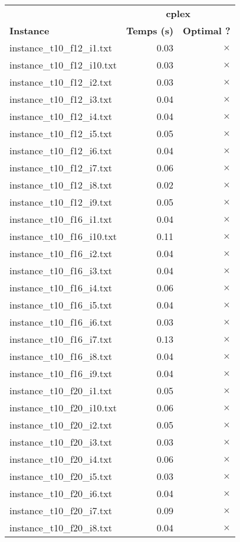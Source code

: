 \documentclass{article}
\begin{document}
\begin{center}
\renewcommand{\arraystretch}{1.4} 
\begin{tabular}{lrr}
	\hline
 & \multicolumn{2}{c}{\textbf{cplex}}\\
\textbf{Instance}  & \textbf{Temps (s)} & \textbf{Optimal ?} \\\hline

instance\_t10\_f12\_i1.txt & 0.03 & 
$\times$
\\
instance\_t10\_f12\_i10.txt & 0.03 & 
$\times$
\\
instance\_t10\_f12\_i2.txt & 0.03 & 
$\times$
\\
instance\_t10\_f12\_i3.txt & 0.04 & 
$\times$
\\
instance\_t10\_f12\_i4.txt & 0.04 & 
$\times$
\\
instance\_t10\_f12\_i5.txt & 0.05 & 
$\times$
\\
instance\_t10\_f12\_i6.txt & 0.04 & 
$\times$
\\
instance\_t10\_f12\_i7.txt & 0.06 & 
$\times$
\\
instance\_t10\_f12\_i8.txt & 0.02 & 
$\times$
\\
instance\_t10\_f12\_i9.txt & 0.05 & 
$\times$
\\
instance\_t10\_f16\_i1.txt & 0.04 & 
$\times$
\\
instance\_t10\_f16\_i10.txt & 0.11 & 
$\times$
\\
instance\_t10\_f16\_i2.txt & 0.04 & 
$\times$
\\
instance\_t10\_f16\_i3.txt & 0.04 & 
$\times$
\\
instance\_t10\_f16\_i4.txt & 0.06 & 
$\times$
\\
instance\_t10\_f16\_i5.txt & 0.04 & 
$\times$
\\
instance\_t10\_f16\_i6.txt & 0.03 & 
$\times$
\\
instance\_t10\_f16\_i7.txt & 0.13 & 
$\times$
\\
instance\_t10\_f16\_i8.txt & 0.04 & 
$\times$
\\
instance\_t10\_f16\_i9.txt & 0.04 & 
$\times$
\\
instance\_t10\_f20\_i1.txt & 0.05 & 
$\times$
\\
instance\_t10\_f20\_i10.txt & 0.06 & 
$\times$
\\
instance\_t10\_f20\_i2.txt & 0.05 & 
$\times$
\\
instance\_t10\_f20\_i3.txt & 0.03 & 
$\times$
\\
instance\_t10\_f20\_i4.txt & 0.06 & 
$\times$
\\
instance\_t10\_f20\_i5.txt & 0.03 & 
$\times$
\\
instance\_t10\_f20\_i6.txt & 0.04 & 
$\times$
\\
instance\_t10\_f20\_i7.txt & 0.09 & 
$\times$
\\
instance\_t10\_f20\_i8.txt & 0.04 & 
$\times$
\\
\hline\end{tabular}
\end{center}
\end{document}
